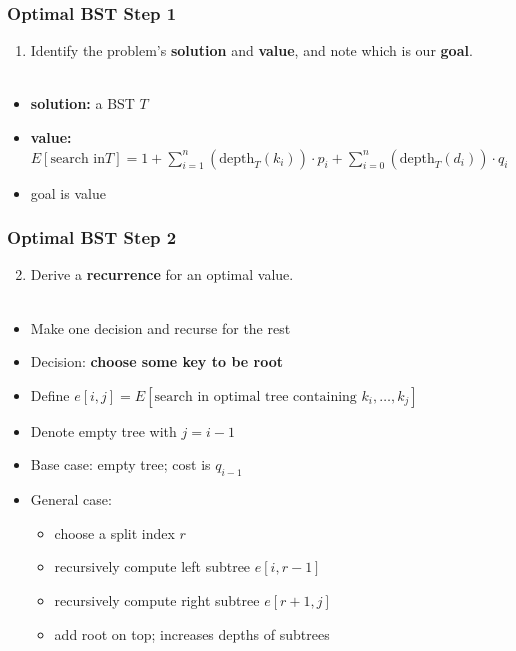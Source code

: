 \documentclass{beamer}
\newcommand{\stanza}{ \\~\ }
\begin{document}
  \begin{frame} \frametitle{Optimal BST Step 1}
    \begin{enumerate}
      \item Identify the problem's \textbf{solution} and \textbf{value}, and note which is our \textbf{goal}.
      \stanza
    \end{enumerate}

    \begin{itemize}
      \item \textbf{solution:} a BST $T$
      \item \textbf{value:}
      $E[\text{search in} T] = 1 + \sum_{i=1}^n (\text{depth}_T(k_i)) \cdot p_i + \sum_{i=0}^n (\text{depth}_T(d_i)) \cdot q_i $
      \item goal is value
    \end{itemize}
  \end{frame}
  
\begin{frame} \frametitle{Optimal BST Step 2}
  \begin{enumerate}
    \setcounter{enumi}{1}
    \item Derive a \textbf{recurrence} for an optimal value.
    \stanza
  \end{enumerate}
  \begin{itemize}
    \item Make one decision and recurse for the rest
    \item Decision: \textbf{choose some key to be root}
    \item Define $e[i, j] = E[\text{search in optimal tree containing } k_i, \ldots, k_j ]$
    \item Denote empty tree with $j=i-1$
    \item Base case: empty tree; cost is $q_{i-1}$
    \item General case:
      \begin{itemize}
        \item choose a split index $r$
        \item recursively compute left subtree $e[i, r-1]$
        \item recursively compute right subtree $e[r+1, j]$
        \item add root on top; increases depths of subtrees
      \end{itemize}
  \end{itemize}
\end{frame}
\end{document}
